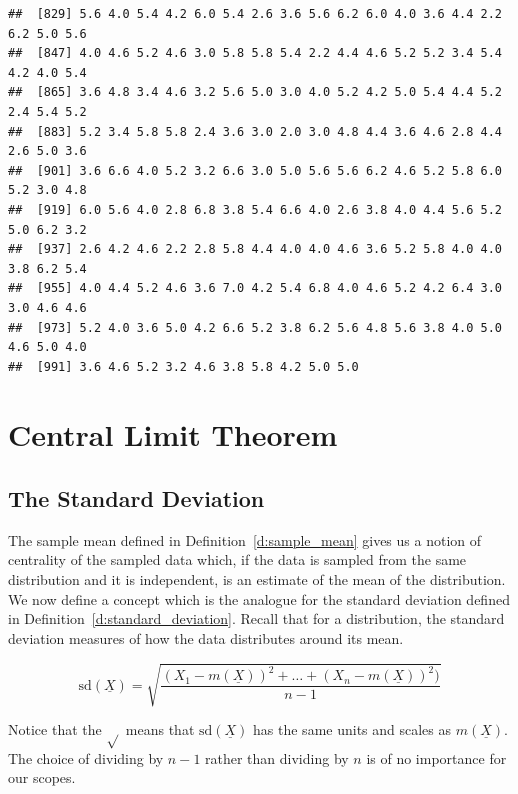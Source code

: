 \begin{ExerciseList}
\begin{knitrout}
\begin{kframe}
\begin{verbatim}
##  [829] 5.6 4.0 5.4 4.2 6.0 5.4 2.6 3.6 5.6 6.2 6.0 4.0 3.6 4.4 2.2 6.2 5.0 5.6
##  [847] 4.0 4.6 5.2 4.6 3.0 5.8 5.8 5.4 2.2 4.4 4.6 5.2 5.2 3.4 5.4 4.2 4.0 5.4
##  [865] 3.6 4.8 3.4 4.6 3.2 5.6 5.0 3.0 4.0 5.2 4.2 5.0 5.4 4.4 5.2 2.4 5.4 5.2
##  [883] 5.2 3.4 5.8 5.8 2.4 3.6 3.0 2.0 3.0 4.8 4.4 3.6 4.6 2.8 4.4 2.6 5.0 3.6
##  [901] 3.6 6.6 4.0 5.2 3.2 6.6 3.0 5.0 5.6 5.6 6.2 4.6 5.2 5.8 6.0 5.2 3.0 4.8
##  [919] 6.0 5.6 4.0 2.8 6.8 3.8 5.4 6.6 4.0 2.6 3.8 4.0 4.4 5.6 5.2 5.0 6.2 3.2
##  [937] 2.6 4.2 4.6 2.2 2.8 5.8 4.4 4.0 4.0 4.6 3.6 5.2 5.8 4.0 4.0 3.8 6.2 5.4
##  [955] 4.0 4.4 5.2 4.6 3.6 7.0 4.2 5.4 6.8 4.0 4.6 5.2 4.2 6.4 3.0 3.0 4.6 4.6
##  [973] 5.2 4.0 3.6 5.0 4.2 6.6 5.2 3.8 6.2 5.6 4.8 5.6 3.8 4.0 5.0 4.6 5.0 4.0
##  [991] 3.6 4.6 5.2 3.2 4.6 3.8 5.8 4.2 5.0 5.0
\end{verbatim}
\end{kframe}
\end{knitrout}


\end{ExerciseList}


\section{Central Limit Theorem}

      \subsection{ The Standard Deviation}
      	The sample mean defined in Definition~\ref{d:sample_mean} gives us a notion of centrality of the sampled data which, if the data is sampled from the same distribution and it is independent, is an estimate of the mean of the distribution. We now define a concept which is the analogue for the standard deviation defined in Definition~\ref{d:standard_deviation}. Recall that for a distribution, the standard deviation measures of how the data distributes around its mean. 
      	\begin{definition}
      		\label{d:sampled_Standard_deviation}
      		\begin{equation}
      			\text{sd}(\underline X) =\sqrt{ \frac{ (X_1 - m(\underline X ))^2 + \ldots + (X_n - m(\underline X))^2)}{n-1}}
      		\end{equation}
      	\end{definition}
	Notice that the $\sqrt{}$ means that $\text{sd}(\underline X)$ has the same units and scales as $m(\underline X)$. The choice of dividing by $n-1$ rather than dividing by $n$ is of no importance for our scopes.

